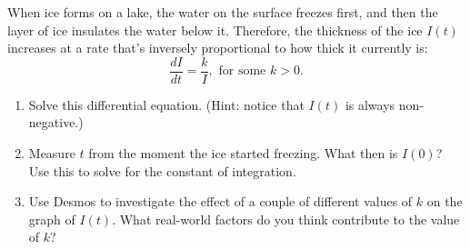 \hrulefill

When ice forms on a lake, the water on the surface freezes first, and then the layer of ice insulates the water below it. Therefore, the thickness of the ice $I(t)$ increases at a rate that's inversely proportional to how thick it currently is:
\[\dfrac{dI}{dt} = \dfrac{k}{I}, \text{ for some } k > 0.\]

\begin{enumerate}
	\item Solve this differential equation. (Hint: notice that $I(t)$ is always non-negative.)

	\vfill

	\item Measure $t$ from the moment the ice started freezing. What then is $I(0)$? Use this to solve for the constant of integration.
	\vfill
	\item Use Desmos to investigate the effect of a couple of different values of $k$ on the graph of $I(t)$. What real-world factors do you think contribute to the value of $k$?
\end{enumerate}

